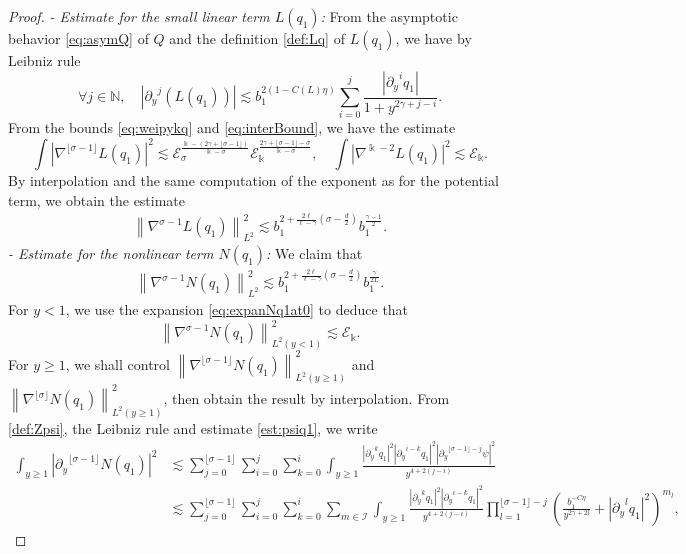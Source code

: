 \documentclass[11pt]{aims}
\theoremstyle{definition}
\numberwithin{equation}{section}
\begin{document}
\begin{proof}
\noindent \textit{- Estimate for the small linear term $L(q_1)$:} From the asymptotic behavior \eqref{eq:asymQ} of $Q$ and the definition \eqref{def:Lq} of $L(q_1)$, we have by Leibniz rule
$$\forall j \in \mathbb{N}, \quad \left|{\partial_y}^j(L(q_1))\right| \lesssim b_1^{2(1 - C(L)\eta)}\sum_{i = 0}^j \frac{|{\partial_y}^i q_1|}{1 + y^{2\gamma + j - i}}.$$
From the bounds \eqref{eq:weipykq} and \eqref{eq:interBound}, we have the estimate 
$$\int |\nabla^{\lfloor\sigma -1 \rfloor} L(q_1)|^2 \lesssim {\mathscr{E}}_\sigma^{\frac{\Bbbk - (2\gamma + \lfloor\sigma -1 \rfloor)}{\Bbbk - \sigma}}{\mathscr{E}}_\Bbbk^{\frac{2\gamma + \lfloor\sigma -1 \rfloor - \sigma}{\Bbbk - \sigma}}, \quad \int |\nabla^{\Bbbk - 2}L(q_1)|^2 \lesssim {\mathscr{E}}_\Bbbk.$$
By interpolation and the same computation of the exponent as for the potential term, we obtain the estimate
\begin{align}
\left\|\nabla^{\sigma - 1}L(q_1)\right\|^2_{L^2} \lesssim  b_1^{2 + \frac{2\ell}{\ell - \gamma}\left(\sigma - \frac{d}{2}\right)} b_1^{\frac{\gamma - 1}{2}}. \label{est:LEsigma}
\end{align}
\noindent \textit{- Estimate for the nonlinear term $N(q_1)$:} We claim that 
\begin{align}
\left\|\nabla^{\sigma - 1}N(q_1)\right\|^2_{L^2} \lesssim  b_1^{2 + \frac{2\ell}{\ell - \gamma}\left(\sigma - \frac{d}{2}\right)} b_1^{\frac{\gamma}{2L}}. \label{est:NEsigma}
\end{align}
For $y < 1$, we use the expansion \eqref{eq:expanNq1at0} to deduce that 
$$\left\|\nabla^{\sigma - 1}N(q_1)\right\|^2_{L^2(y < 1)} \lesssim {\mathscr{E}}_\Bbbk. $$
For $y \geq 1$, we shall control $\left\|\nabla^{\lfloor\sigma -1 \rfloor}N(q_1)\right\|^2_{L^2(y \geq 1)}$ and $\left\|\nabla^{\lfloor\sigma\rfloor}N(q_1)\right\|^2_{L^2(y \geq 1)}$, then obtain the result by interpolation. 
From \eqref{def:Zpsi}, the Leibniz rule and estimate \eqref{est:psiq1}, we write   
\begin{align*}
\int_{y \geq 1}|{\partial_y}^{\lfloor\sigma -1 \rfloor} N(q_1)|^2  &\lesssim \sum_{j = 0}^{\lfloor\sigma -1 \rfloor} \sum_{i = 0}^j \sum_{k = 0}^i \int_{y \geq 1} \frac{|{\partial_y}^k q_1|^2 |{\partial_y}^{i - k}q_1|^2 |{\partial_y}^{\lfloor\sigma -1 \rfloor - j}\psi|^2}{y^{4 + 2(j - i)}}\nonumber\\
& \lesssim \sum_{j = 0}^{\lfloor\sigma -1 \rfloor} \sum_{i = 0}^j \sum_{k = 0}^i \sum_{m \in \mathcal{I}} \int_{y \geq 1} \frac{|{\partial_y}^k q_1|^2 |{\partial_y}^{i - k}q_1|^2}{y^{4 + 2(j - i)}}\prod_{l = 1}^{\lfloor\sigma -1 \rfloor - j} \left(\frac{b_1^{-C\eta}}{y^{2\gamma + 2l}} + |{\partial_y}^l q_1|^2\right)^{m_l},

\end{align*}
\end{proof}
\end{document}

